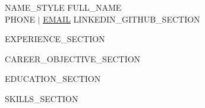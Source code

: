\documentclass[letterpaper,11pt]{article}
\begin{document}
\begin{center}
    {{NAME_STYLE}} \Huge \scshape {{FULL_NAME}} \\ \vspace{3pt}
    \small {{PHONE}} $|$ \href{mailto:{{EMAIL}}}{\underline{{{EMAIL}}}} {{LINKEDIN_GITHUB_SECTION}}
\end{center}
\vspace{-4pt}

\begin{multicols}{2}
\raggedcolumns

{{EXPERIENCE_SECTION}}

\columnbreak

{{CAREER_OBJECTIVE_SECTION}}

\vspace{4pt}
{{EDUCATION_SECTION}}

\vspace{6pt}
{{SKILLS_SECTION}}

\end{multicols}
\end{document}

